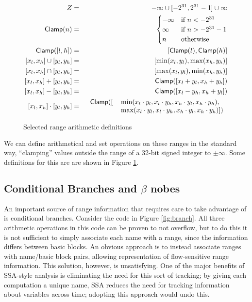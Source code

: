 \documentclass{article}
\newcommand{\Clamp}{\mathsf{Clamp}}
\let\x\cdot
\begin{document}
\begin{figure}[ht]
\begin{eqnarray*}
Z &=& {-\infty} \cup [-2^{31}, 2^{31}-1] \cup {\infty} \\
\Clamp(n) &=& \begin{cases}
-\infty &\text{if } n < -2^{31} \\
\infty &\text{if } n > -2^{31}-1 \\
n&\text{otherwise } \\
\end{cases}\\
\Clamp([l, h]) &=& [\Clamp(l), \Clamp(h)] \\
{[x_l, x_h] \cup [y_l, y_h]} &=& [\min(x_l, y_l), \max(x_h, y_h)] \\
{[x_l, x_h] \cap [y_l, y_h]} &=& [\max(x_l, y_l), \min(x_h, y_h)] \\
{[x_l, x_h] + [y_l, y_h]} &=& \Clamp ([x_l + y_l, x_h + y_h]) \\
{[x_l, x_h] - [y_l, y_h]} &=& \Clamp ([x_l - y_h, x_h + y_l]) \\
{[x_l, x_h] \x [y_l, y_h]} &=& 
\begin{tabular}{rl}
$\Clamp ([$&$\min(x_l \x y_l, x_l \x y_h, x_h \x y_l, x_h \x y_h),$\\
&$\max(x_l \x y_l, x_l \x y_h, x_h \x y_l, x_h \x y_h)])$ \\
\end{tabular}
\end{eqnarray*}

\caption{Selected range arithmetic definitions}
\label{fig:range_arith}
\end{figure}

We can define arithmetical and set operations on these ranges in the
standard way, ``clamping'' values outside the range of a 32-bit signed
integer to $\pm \infty$. Some definitions for this are are shown in
Figure \ref{fig:range_arith}.

\subsection{Conditional Branches and $\beta$ nobes}

An important source of range information that requires care to take
advantage of is conditional branches. Consider the code in Figure
\ref{fig:branch}. All three arithmetic operations in this code can be
proven to not overflow, but to do this it is not sufficient to simply
associate each name with a range, since the information differs
between basic blocks. An obvious approach is to instead associate
ranges with name/basic block pairs, allowing representation of
flow-sensitive range information. This solution, however, is
unsatisfying. One of the major benefits of SSA-style analysis is
eliminating the need for this sort of tracking; by giving each
computation a unique name, SSA reduces the need for tracking
information about variables across time; adopting this approach would
undo this.
\end{document}
